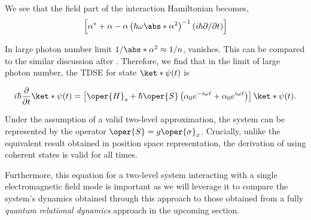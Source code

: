 We see that the field part of the interaction Hamiltonian becomes, 
\begin{eqnarray}
    \label{eq:class_jcm_eq29}
    \left[\alpha^* + \alpha - \alpha \left(\hbar \omega \abs*{\alpha}^2\right)^{-1}
    \left(i \hbar \partial / \partial t\right) \right]
\end{eqnarray}

In large photon number limit \(1/\abs*{\alpha}^2 \approx 1/n\), vanishes. This can be 
compared to the similar discussion after . Therefore, we find that in 
the limit of large photon number, the TDSE for state \(\ket*{\psi(t)}\) is 
\begin{mdframed}
    \begin{equation}
        \label{eq:class_jcm_eq30}
        i\hbar \dfrac{\partial}{\partial t} \ket*{\psi(t)} = \left[
            \oper{H}_s +  \hbar \oper{S} \left(\alpha_0 e^{-i \omega t} + \alpha_0 e^{i \omega t}\right) 
        \right] \ket*{\psi(t)}.
    \end{equation}
\end{mdframed}

Under the assumption of a valid two-level approximation, the system can be represented 
by the operator $\oper{S} = g\oper{\sigma}_x$. Crucially, unlike the equivalent result obtained in 
position space representation, the derivation of  using coherent 
states is valid for all times.

Furthermore, this equation for a two-level system interacting with a single electromagnetic field mode is important as we will leverage it to compare the system's dynamics obtained through this approach to those obtained from a fully \emph{quantum relational dynamics} approach in the upcoming section.